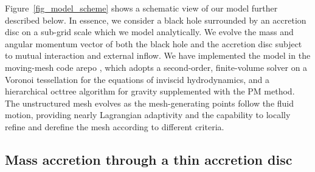 \documentclass[a4paper,fleqn,usenatbib]{mnras}
\begin{document}
Figure~\ref{fig_model_scheme} shows a schematic view of our model further described below.
In essence, we consider a black hole surrounded by an accretion disc on a sub-grid scale which we model analytically.
We evolve the mass and angular momentum vector of both the black hole and the accretion disc subject to mutual interaction and external inflow.
We have implemented the model in the moving-mesh code {\sc arepo} \citep{springel+10, pakmor+16}, which adopts a second-order, finite-volume solver on a Voronoi tessellation for the equations of inviscid hydrodynamics, and a hierarchical octtree algorithm for gravity \citep{barnes+86,springel+05} supplemented with the PM method.
The unstructured mesh evolves as the mesh-generating points follow the fluid motion, providing nearly Lagrangian adaptivity and the capability to locally refine and derefine the mesh according to different criteria.


\subsection{Mass accretion through a thin accretion disc}\label{subsec_accretion}
\end{document}
